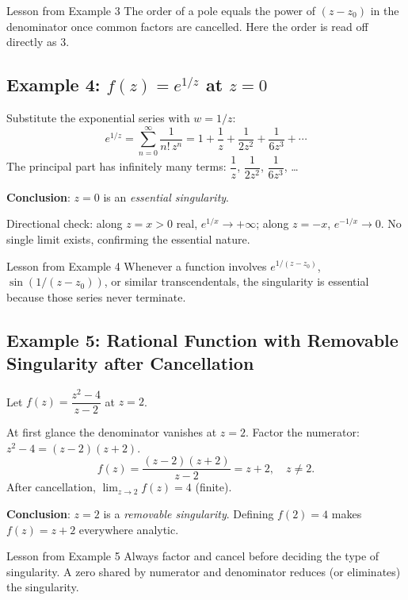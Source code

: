 \documentclass[12pt,a4paper]{article}
\begin{document}
\begin{learnbox}{Lesson from Example 3}
The order of a pole equals the power of $(z - z_0)$ in the denominator once common factors
are cancelled. Here the order is read off directly as 3.
\end{learnbox}

\subsection*{Example 4: $f(z) = e^{1/z}$ at $z = 0$}

Substitute the exponential series with $w = 1/z$:
\[
  e^{1/z} = \sum_{n=0}^{\infty} \frac{1}{n!\, z^n}
  = 1 + \frac{1}{z} + \frac{1}{2z^2} + \frac{1}{6z^3} + \cdots
\]
The principal part has infinitely many terms: $\dfrac{1}{z}$, $\dfrac{1}{2z^2}$, $\dfrac{1}{6z^3}$, \ldots

\textbf{Conclusion}: $z = 0$ is an \emph{essential singularity}.

Directional check: along $z = x > 0$ real, $e^{1/x} \to +\infty$; along $z = -x$, $e^{-1/x} \to 0$.
No single limit exists, confirming the essential nature.

\begin{learnbox}{Lesson from Example 4}
Whenever a function involves $e^{1/(z-z_0)}$, $\sin(1/(z-z_0))$, or similar transcendentals,
the singularity is essential because those series never terminate.
\end{learnbox}

\subsection*{Example 5: Rational Function with Removable Singularity after Cancellation}

Let $f(z) = \dfrac{z^2 - 4}{z - 2}$ at $z = 2$.

At first glance the denominator vanishes at $z = 2$.
Factor the numerator: $z^2 - 4 = (z-2)(z+2)$.
\[
  f(z) = \frac{(z-2)(z+2)}{z-2} = z + 2, \quad z \neq 2.
\]
After cancellation, $\lim_{z \to 2} f(z) = 4$ (finite).

\textbf{Conclusion}: $z = 2$ is a \emph{removable singularity}.
Defining $f(2) = 4$ makes $f(z) = z + 2$ everywhere analytic.

\begin{learnbox}{Lesson from Example 5}
Always factor and cancel before deciding the type of singularity.
A zero shared by numerator and denominator reduces (or eliminates) the singularity.
\end{learnbox}
\end{document}
